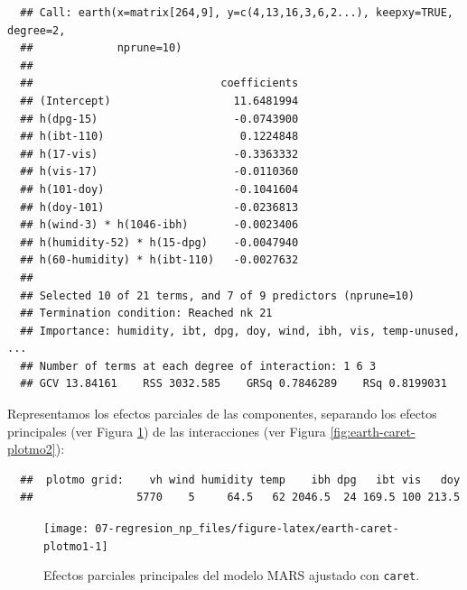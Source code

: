 \documentclass[
]{book}
\newenvironment{Shaded}{\begin{snugshade}}{\end{snugshade}}
\newcommand{\AttributeTok}[1]{\textcolor[rgb]{0.77,0.63,0.00}{#1}}
\newcommand{\CommentTok}[1]{\textcolor[rgb]{0.56,0.35,0.01}{\textit{#1}}}
\newcommand{\DecValTok}[1]{\textcolor[rgb]{0.00,0.00,0.81}{#1}}
\newcommand{\FunctionTok}[1]{\textcolor[rgb]{0.00,0.00,0.00}{#1}}
\newcommand{\NormalTok}[1]{#1}
\newcommand{\SpecialCharTok}[1]{\textcolor[rgb]{0.00,0.00,0.00}{#1}}
\newcommand{\StringTok}[1]{\textcolor[rgb]{0.31,0.60,0.02}{#1}}
\theoremstyle{break}
\theoremstyle{nonumberplain}
\renewcommand{\CommentTok}[1]{\textcolor[rgb]{0.41,0.41,0.41}{\texttt{#1}}}
\begin{document}
\begin{verbatim}
  ## Call: earth(x=matrix[264,9], y=c(4,13,16,3,6,2...), keepxy=TRUE, degree=2,
  ##             nprune=10)
  ## 
  ##                             coefficients
  ## (Intercept)                   11.6481994
  ## h(dpg-15)                     -0.0743900
  ## h(ibt-110)                     0.1224848
  ## h(17-vis)                     -0.3363332
  ## h(vis-17)                     -0.0110360
  ## h(101-doy)                    -0.1041604
  ## h(doy-101)                    -0.0236813
  ## h(wind-3) * h(1046-ibh)       -0.0023406
  ## h(humidity-52) * h(15-dpg)    -0.0047940
  ## h(60-humidity) * h(ibt-110)   -0.0027632
  ## 
  ## Selected 10 of 21 terms, and 7 of 9 predictors (nprune=10)
  ## Termination condition: Reached nk 21
  ## Importance: humidity, ibt, dpg, doy, wind, ibh, vis, temp-unused, ...
  ## Number of terms at each degree of interaction: 1 6 3
  ## GCV 13.84161    RSS 3032.585    GRSq 0.7846289    RSq 0.8199031
\end{verbatim}

Representamos los efectos parciales de las componentes, separando los efectos principales (ver Figura \ref{fig:earth-caret-plotmo1}) de las interacciones (ver Figura \ref{fig:earth-caret-plotmo2}):



\begin{Shaded}
\end{Shaded}

\begin{verbatim}
  ##  plotmo grid:    vh wind humidity temp    ibh dpg   ibt vis   doy
  ##                5770    5     64.5   62 2046.5  24 169.5 100 213.5
\end{verbatim}

\begin{figure}[!htb]

{\centering \texttt{[image: 07-regresion\_np\_files/figure-latex/earth-caret-plotmo1-1]} 

}

\caption{Efectos parciales principales del modelo MARS ajustado con \texttt{caret}.}\label{fig:earth-caret-plotmo1}
\end{figure}
\end{document}
